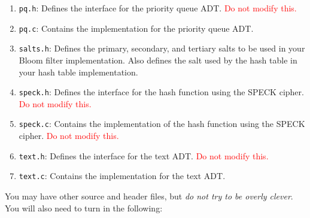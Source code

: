 \begin{enumerate}
  \item \texttt{pq.h}: Defines the interface for the priority queue ADT.
    \textcolor{red}{Do not modify this.}

  \item \texttt{pq.c}: Contains the implementation for the priority queue ADT.

  \item \texttt{salts.h}: Defines the primary, secondary, and tertiary
    salts to be used in your Bloom filter implementation. Also defines
    the salt used by the hash table in your hash table implementation.

  \item \texttt{speck.h}: Defines the interface for the hash function
    using the SPECK cipher. \textcolor{red}{Do not modify this.}

  \item \texttt{speck.c}: Contains the implementation of the hash
    function using the SPECK cipher. \textcolor{red}{Do not modify this.}

  \item \texttt{text.h}: Defines the interface for the text ADT.
    \textcolor{red}{Do not modify this.}

  \item \texttt{text.c}: Contains the implementation for the text ADT.
\end{enumerate}

You may have other source and header files, but \emph{do not try to be
overly clever}. You will also need to turn in the following:

